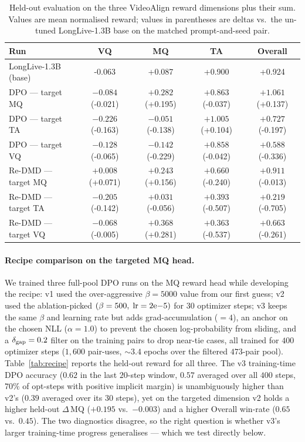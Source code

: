 \documentclass{article}
\begin{document}
\begin{table}[t]
\centering
\caption{Held-out evaluation on the three VideoAlign reward dimensions plus their sum. Values are mean normalised reward; values in parentheses are deltas vs.\ the un-tuned LongLive-1.3B base on the matched prompt-and-seed pair.}
\label{tab:main}
\begin{tabular}{lcccc}
\toprule
Run & VQ & MQ & TA & Overall \\
\midrule
LongLive-1.3B (base) & -0.063 & +0.087 & +0.900 & +0.924 \\
\midrule
DPO --- target MQ & $-0.084$ (-0.021) & $+0.282$ (+0.195) & $+0.863$ (-0.037) & $+1.061$ (+0.137) \\
DPO --- target TA & $-0.226$ (-0.163) & $-0.051$ (-0.138) & $+1.005$ (+0.104) & $+0.727$ (-0.197) \\
DPO --- target VQ & $-0.128$ (-0.065) & $-0.142$ (-0.229) & $+0.858$ (-0.042) & $+0.588$ (-0.336) \\
\midrule
Re-DMD --- target MQ & $+0.008$ (+0.071) & $+0.243$ (+0.156) & $+0.660$ (-0.240) & $+0.911$ (-0.013) \\
Re-DMD --- target TA & $-0.205$ (-0.142) & $+0.031$ (-0.056) & $+0.393$ (-0.507) & $+0.219$ (-0.705) \\
Re-DMD --- target VQ & $-0.068$ (-0.005) & $+0.368$ (+0.281) & $+0.363$ (-0.537) & $+0.663$ (-0.261) \\
\bottomrule
\end{tabular}
\end{table}

\paragraph{Recipe comparison on the targeted MQ head.} We trained three full-pool DPO runs on the MQ reward head while developing the recipe: v1 used the over-aggressive $\beta=5000$ value from our first guess; v2 used the ablation-picked $(\beta=500,\;{\rm lr}=2{\rm e}{-}5)$ for $30$ optimizer steps; v3 keeps the same $\beta$ and learning rate but adds grad-accumulation ($=4$), an anchor on the chosen NLL ($\alpha=1.0$) to prevent the chosen log-probability from sliding, and a $\delta_{\rm gap}=0.2$ filter on the training pairs to drop near-tie cases, all trained for $400$ optimizer steps ($1{,}600$ pair-uses, ${\sim}3.4$ epochs over the filtered $473$-pair pool). Table~\ref{tab:recipe} reports the held-out reward for all three. The v3 training-time DPO accuracy ($0.62$ in the last $20$-step window, $0.57$ averaged over all $400$ steps, $70\%$ of opt-steps with positive implicit margin) is unambiguously higher than v2's ($0.39$ averaged over its $30$ steps), yet on the targeted dimension v2 holds a higher held-out $\Delta$\,MQ ($+0.195$ vs.\ $-0.003$) and a higher Overall win-rate ($0.65$ vs.\ $0.45$). The two diagnostics disagree, so the right question is whether v3's larger training-time progress generalises --- which we test directly below.
\end{document}

